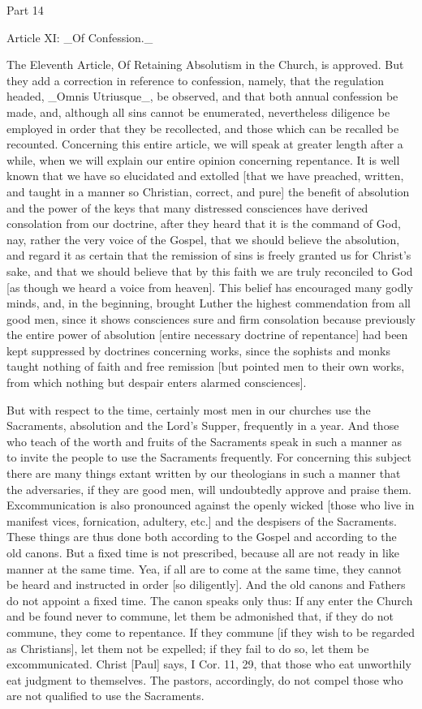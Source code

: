 Part 14


Article XI: _Of Confession._

The Eleventh Article, Of Retaining Absolutism in the Church, is
approved.  But they add a correction in reference to confession,
namely, that the regulation headed, _Omnis Utriusque_, be observed,
and that both annual confession be made, and, although all sins
cannot be enumerated, nevertheless diligence be employed in order
that they be recollected, and those which can be recalled be
recounted.  Concerning this entire article, we will speak at greater
length after a while, when we will explain our entire opinion
concerning repentance.  It is well known that we have so elucidated
and extolled [that we have preached, written, and taught in a manner
so Christian, correct, and pure] the benefit of absolution and the
power of the keys that many distressed consciences have derived
consolation from our doctrine, after they heard that it is the
command of God, nay, rather the very voice of the Gospel, that we
should believe the absolution, and regard it as certain that the
remission of sins is freely granted us for Christ's sake, and that we
should believe that by this faith we are truly reconciled to God [as
though we heard a voice from heaven].  This belief has encouraged
many godly minds, and, in the beginning, brought Luther the highest
commendation from all good men, since it shows consciences sure and
firm consolation because previously the entire power of absolution
[entire necessary doctrine of repentance] had been kept suppressed by
doctrines concerning works, since the sophists and monks taught
nothing of faith and free remission [but pointed men to their own
works, from which nothing but despair enters alarmed consciences].

But with respect to the time, certainly most men in our churches use
the Sacraments, absolution and the Lord's Supper, frequently in a
year.  And those who teach of the worth and fruits of the Sacraments
speak in such a manner as to invite the people to use the Sacraments
frequently.  For concerning this subject there are many things extant
written by our theologians in such a manner that the adversaries, if
they are good men, will undoubtedly approve and praise them.
Excommunication is also pronounced against the openly wicked [those
who live in manifest vices, fornication, adultery, etc.] and the
despisers of the Sacraments.  These things are thus done both
according to the Gospel and according to the old canons.  But a fixed
time is not prescribed, because all are not ready in like manner at
the same time.  Yea, if all are to come at the same time, they cannot
be heard and instructed in order [so diligently].  And the old canons
and Fathers do not appoint a fixed time.  The canon speaks only thus:
If any enter the Church and be found never to commune, let them be
admonished that, if they do not commune, they come to repentance.  If
they commune [if they wish to be regarded as Christians], let them
not be expelled; if they fail to do so, let them be excommunicated.
Christ [Paul] says, I Cor. 11, 29, that those who eat unworthily eat
judgment to themselves.  The pastors, accordingly, do not compel
those who are not qualified to use the Sacraments.

